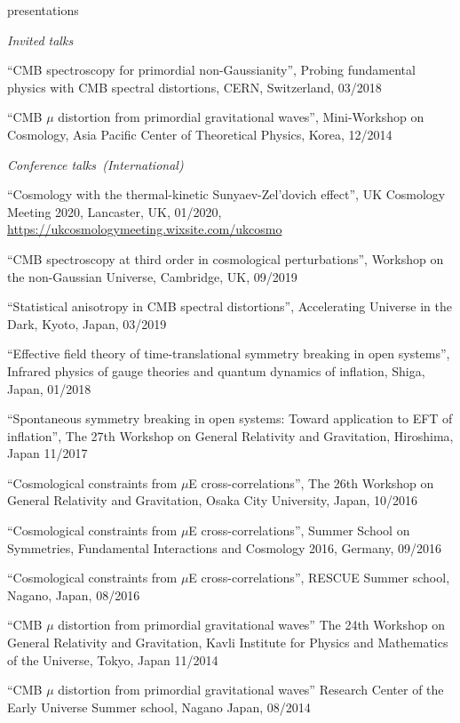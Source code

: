 \documentclass[a4paper]{resume} %
\begin{document}
\begin{rSection}{presentations}

\noindent\textit{Invited talks}
\begin{etaremune}
	 \item
``CMB spectroscopy for primordial non-Gaussianity'', Probing fundamental physics with CMB spectral distortions, CERN, Switzerland, 03/2018
    \item 
``CMB $\mu$ distortion from primordial gravitational waves'', Mini-Workshop on Cosmology, Asia Pacific Center of Theoretical Physics, Korea, 12/2014
\end{etaremune}

\noindent\textit{Conference talks~(International)}

\begin{etaremune}


	\item
	``Cosmology with the thermal-kinetic Sunyaev-Zel'dovich effect'', UK Cosmology Meeting 2020, Lancaster, UK, 01/2020, \url{https://ukcosmologymeeting.wixsite.com/ukcosmo}

	\item
	``CMB spectroscopy at third order in cosmological perturbations'', Workshop on the non-Gaussian Universe, Cambridge, UK, 09/2019
	\item
	``Statistical anisotropy in CMB spectral distortions'', Accelerating Universe in the Dark, Kyoto, Japan, 03/2019
	\item
    ``Effective field theory of time-translational symmetry breaking in open systems'', Infrared physics of gauge theories and quantum dynamics of inflation, Shiga, Japan, 01/2018
    
    \item
    ``Spontaneous symmetry breaking in open systems: Toward application to EFT of inflation'', The 27th Workshop on General Relativity and Gravitation, Hiroshima, Japan 11/2017
    \item
    ``Cosmological constraints from $\mu$E cross-correlations'', The 26th Workshop on General Relativity and Gravitation, Osaka City University, Japan, 10/2016
    \item
    ``Cosmological constraints from $\mu$E cross-correlations'', Summer School on Symmetries, Fundamental Interactions and Cosmology 2016, Germany, 09/2016
    \item
    ``Cosmological constraints from $\mu$E cross-correlations'', RESCUE Summer school, Nagano, Japan, 08/2016
    \item
``CMB $\mu$ distortion from primordial gravitational waves'' The 24th Workshop on General Relativity and Gravitation, Kavli Institute for Physics and Mathematics of the Universe, Tokyo, Japan 11/2014     
    \item 
    ``CMB $\mu$ distortion from primordial gravitational waves'' Research Center of the Early Universe Summer school, Nagano Japan, 08/2014
    

\end{etaremune}
\end{rSection}
\end{document}
